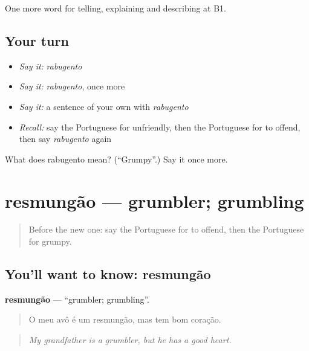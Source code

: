 \begin{grammarlens}[title={What you've built}]
One more word for telling, explaining and describing at B1.
\end{grammarlens}

\subsection*{Your turn}
\begin{itemize}
\raggedright
  \item \emph{Say it:} \emph{rabugento}
  \item \emph{Say it:} \emph{rabugento}, once more
  \item \emph{Say it:} a sentence of your own with \emph{rabugento}
  \item \emph{Recall:} say the Portuguese for unfriendly, then the Portuguese for to offend, then say \emph{rabugento} again
\end{itemize}

\begin{tcolorbox}[breakable,colback=teal!4,colframe=teal!35!black,title={Before you move on}]
What does rabugento mean? (\textquotedblleft{}Grumpy\textquotedblright{}.) Say it once more.
\end{tcolorbox}
\section[resmungão]{resmungão — grumbler; grumbling}

\label{lesson:PT-C474-resmungao}



\begin{quote}
Before the new one: say the Portuguese for to offend, then the Portuguese for grumpy.
\end{quote}

\subsection*{You'll want to know: resmungão}
\textbf{resmungão} — \textquotedblleft{}grumbler; grumbling\textquotedblright{}.

\begin{quote}
O meu avô é um resmungão, mas tem bom coração.
\end{quote}

\begin{quote}
\emph{My grandfather is a grumbler, but he has a good heart.}
\end{quote}

